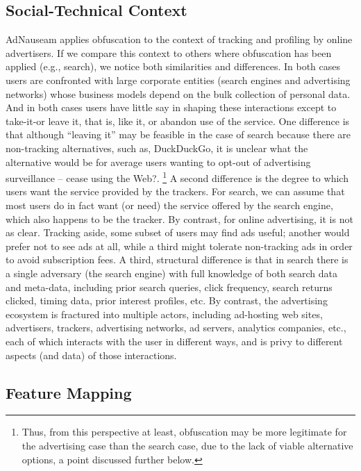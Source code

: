 \documentclass[conference]{IEEEtran}
\begin{document}
\subsection{Social-Technical Context}

AdNauseam applies obfuscation to the context of tracking and profiling by online advertisers. If we compare this context to others where obfuscation has been applied (e.g., search), we notice both similarities and differences. In both cases users are confronted with large corporate entities (search engines and advertising networks) whose business models depend on the bulk collection of personal data. And in both cases users have little say in shaping these interactions except to take-it-or leave it, that is, like it, or abandon use of the service. One difference is that although “leaving it” may be feasible in the case of search because there are non-tracking alternatives, such as, DuckDuckGo, it is unclear what the alternative would be for average users wanting to opt-out of advertising surveillance – cease using the Web?. \footnote{Thus, from this perspective at least, obfuscation may be more legitimate for the advertising case than the search case, due to the lack of viable alternative options, a point discussed further below.} A second difference is the degree to which users want the service provided by the trackers. For search, we can assume that most users do in fact want (or need) the service offered by the search engine, which also happens to be the tracker. By contrast, for online advertising, it is not as clear. Tracking aside, some subset of users may find ads useful; another would prefer not to see ads at all, while a third might tolerate non-tracking ads in order to avoid subscription fees. A third, structural difference is that in search there is a single adversary (the search engine) with full knowledge of both search data and meta-data, including prior search queries, click frequency, search returns clicked, timing data, prior interest profiles, etc. By contrast, the advertising ecosystem is fractured into multiple actors, including ad-hosting web sites, advertisers, trackers, advertising networks, ad servers, analytics companies, etc., each of which interacts with the user in different ways, and is privy to different aspects (and data) of those interactions.

\subsection{Feature Mapping}
\end{document}
